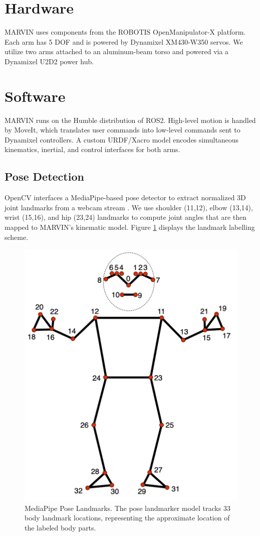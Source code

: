 \documentclass[manuscript,screen]{acmart} %
\begin{document}
\section{Hardware}
MARVIN uses components from the ROBOTIS OpenManipulator-X platform. Each arm has 
5 DOF and is powered by Dynamixel XM430-W350 servos. We utilize two arms attached 
to an aluminum-beam torso and powered via a Dynamixel U2D2 power hub.

\section{Software}
MARVIN runs on the Humble distribution of ROS2. High-level motion is handled by 
MoveIt, which translates user commands into low-level commands sent to Dynamixel 
controllers. A custom URDF/Xacro model encodes simultaneous kinematics, 
inertial, and control interfaces for both arms.

\subsection{Pose Detection}
OpenCV interfaces a MediaPipe-based pose detector to extract 
normalized 3D joint landmarks from a webcam stream \cite{noauthor_mediapipe_nodate}. 
We use shoulder (11,12), elbow (13,14), wrist (15,16), and hip 
(23,24) landmarks to compute joint angles that are then 
mapped to MARVIN's kinematic model. Figure \ref{fig:pose-landmarks}
displays the landmark labelling scheme.

\begin{figure}[htbp]
  \centering
  \includegraphics[width=0.5\linewidth]{assets/pose-landmarks.png}
  \caption{MediaPipe Pose Landmarks. The pose landmarker model tracks 33 body landmark locations, representing the approximate location of the labeled body parts.}
  \label{fig:pose-landmarks}
\end{figure}
\end{document}
